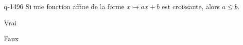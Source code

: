 \begin{truefalse}{q-1496}
Si une fonction affine de la forme $x\mapsto ax+b$ est croissante, alors $a\leq b$.
\item Vrai
\item* Faux
\end{truefalse}

